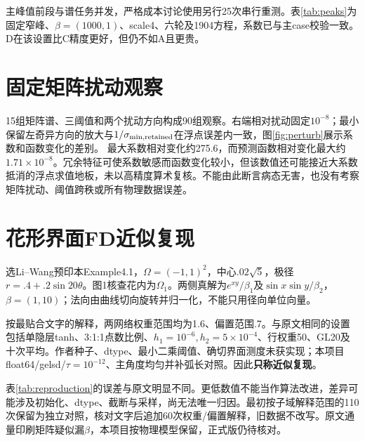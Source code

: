 主峰值前段与谱任务并发，严格成本讨论使用另行25次串行重测。表\ref{tab:peaks}为固定窄峰、$\beta=(1000,1)$、scale4、六轮及1904方程，系数已与主case校验一致。D在该设置比C精度更好，但仍不如A且更贵。
\begin{table}[htbp]\centering\caption{固定峰值场景的串行完整成本与误差}\label{tab:peaks}\end{table}

\section{固定矩阵扰动观察}
15组矩阵谱、三阈值和两个扰动方向构成90组观察。右端相对扰动固定$10^{-8}$；最小保留左奇异方向的放大与$1/\sigma_{\min,\rm retained}$在浮点误差内一致，图\ref{fig:perturb}展示系数和函数变化的差别。
最大系数相对变化约275.6，而预测函数相对变化最大约$1.71\times10^{-8}$。冗余特征可使系数敏感而函数变化较小，但该数值还可能接近大系数抵消的浮点求值地板，未以高精度算术复核。不能由此断言病态无害，也没有考察矩阵扰动、阈值跨秩或所有物理数据误差。

\section{花形界面FD近似复现}
选Li--Wang预印本Example4.1\cite{interfacepreprint}，$\Omega=(-1,1)^2$，中心$.02\sqrt5$，极径$r=.4+.2\sin20\theta$。图1核查花内为$\Omega_1$。两侧真解为$e^{xy}/\beta_1$及$\sin x\sin y/\beta_2$，$\beta=(1,10)$；法向由曲线切向旋转并归一化，不能只用径向单位向量。

按最贴合文字的解释，两网络权重范围均为1.6、偏置范围.7。与原文相同的设置包括单隐层tanh、3:1:1点数比例、$h_1=10^{-6},h_2=5\times10^{-4}$、行权重50、GL20及十次平均。作者种子、dtype、最小二乘阈值、确切界面测度未获实现；本项目float64/gelsd/$\tau=10^{-12}$、主角度均匀并补弧长对照。因此\textbf{只称近似复现}。
\begin{table}[htbp]\centering\small\caption{原文表1与本项目近似复现，十种子均值}\label{tab:reproduction}\resizebox{\textwidth}{!}{}\end{table}
表\ref{tab:reproduction}的误差与原文明显不同。更低数值不能当作算法改进，差异可能涉及初始化、dtype、截断与采样，尚无法唯一归因。最初按子域解释范围的110次保留为独立对照，核对文字后追加60次权重/偏置解释，旧数据不改写。原文通量印刷矩阵疑似漏$\beta$，本项目按物理模型保留，正式版仍待核对。

